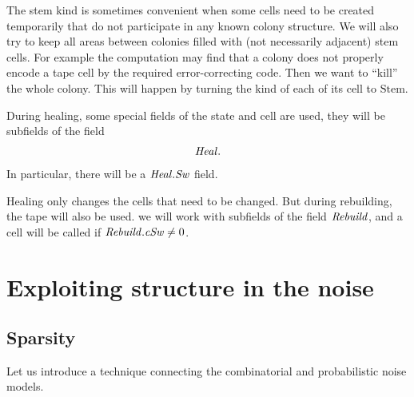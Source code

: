 \documentclass[12pt]{memoir}
\newcommand{\fld}[1]{\ensuremath{\textit{#1\/}}}
\newcommand{\Addr}{\fld{Addr}}
\newcommand{\cAddr}{\fld{cAddr}}
\newcommand{\Core}{\fld{Core}}
\newcommand{\cCore}{\fld{cCore}}
\newcommand{\Drift}{\fld{Drift}}
\newcommand{\cDrift}{\fld{cDrift}}
\newcommand{\Kind}{\fld{Kind}}
\newcommand{\cKind}{\fld{cKind}}
\newcommand{\Heal}{\fld{Heal}}
\newcommand{\Rebuild}{\fld{Rebuild}}
\newcommand{\Sweep}{\fld{Sw}}
\newcommand{\cSweep}{\fld{cSw}}
\newcommand{\Stem}{\mathrm{Stem}}
\begin{document}
The stem kind is sometimes convenient when some cells need to be created temporarily
that do not participate in any known colony structure.
We will also try to keep all areas between colonies filled with (not necessarily adjacent)
stem cells.
For example the computation may find that a colony does not properly encode
a tape cell by the required error-correcting code.
Then we want to ``kill'' the whole colony.
This will happen by turning the kind of each of its cell to \( \Stem \).




During healing, some special fields of the state and cell are used, they will be subfields of 
the field
 \begin{align}\label{eq:Heal}
   \Heal.
 \end{align} 
In particular, there will be a \( \Heal.\Sweep \) field.

Healing only changes the cells that need to be changed.
But during rebuilding, the tape will also be used.
we will work with subfields of the field \( \Rebuild \), 
and a cell will be called  if \( \Rebuild.\cSweep\ne 0 \).


\section{Exploiting structure in the noise}\label{sec:noise}

\subsection{Sparsity}\label{sec:sparsity}
Let us introduce a technique connecting the combinatorial and probabilistic
noise models.
\end{document}
